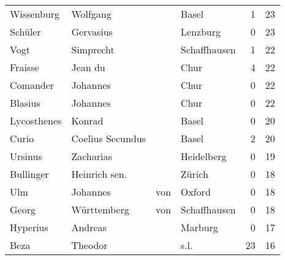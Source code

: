 \begin{center}
\begin{tiny}
\begin{longtabu}{llllrr}
               Wissenburg &                           Wolfgang &             &                                       Basel &          1 &        23 \\
                  Schüler &                          Gervasius &             &                                    Lenzburg &          0 &        23 \\
                     Vogt &                          Simprecht &             &                                Schaffhausen &          1 &        22 \\
                  Fraisse &                            Jean du &             &                                        Chur &          4 &        22 \\
                 Comander &                           Johannes &             &                                        Chur &          0 &        22 \\
                  Blasius &                           Johannes &             &                                        Chur &          0 &        22 \\
              Lycosthenes &                             Konrad &             &                                       Basel &          0 &        20 \\
                    Curio &                   Coelius Secundus &             &                                       Basel &          2 &        20 \\
                  Ursinus &                          Zacharias &             &                                  Heidelberg &          0 &        19 \\
                Bullinger &                      Heinrich sen. &             &                                      Zürich &          0 &        18 \\
                      Ulm &                           Johannes &         von &                                      Oxford &          0 &        18 \\
                    Georg &                        Württemberg &         von &                                Schaffhausen &          0 &        18 \\
                 Hyperius &                            Andreas &             &                                     Marburg &          0 &        17 \\
                     Beza &                            Theodor &             &                                        s.l. &         23 &        16 \\

\end{longtabu}
\end{tiny}
\end{center}
